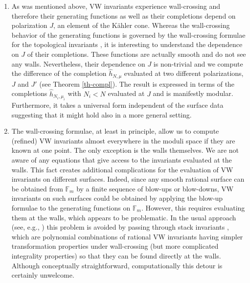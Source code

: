 \documentclass[12pt,letterpaper]{JHEP3}
\newcommand{\IF}{\mathds{F}}
\def\whh{\widehat h}
\begin{document}
\begin{enumerate}
\item 
As was mentioned above, VW invariants experience wall-crossing and therefore their generating functions
as well as their completions depend on polarization $J$, an element of the K\"ahler cone.
Whereas the wall-crossing behavior of the generating functions is governed by the wall-crossing formulae 
for the topological invariants \cite{ks,Joyce:2008pc}, it is interesting to understand the dependence on $J$ of their completions.
These functions are actually smooth and do not see any walls. Nevertheless, their dependence on $J$ is non-trivial
and we compute the difference of the completion $\whh_{N,\mu}$ evaluated at two different polarizations, $J$ and $J'$  
(see Theorem \ref{th-compl}).
The result is expressed in terms of the completions $\whh_{N_i,\mu_i}$ with $N_i<N$ evaluated at $J$ and is manifestly modular.
Furthermore, it takes a universal form independent of the surface data suggesting that it might hold also in a more general setting.

\item 
The wall-crossing formulae, at least in principle, allow us to compute 
(refined) VW invariants almost everywhere in the moduli space if they are known
at one point. The only exception is the walls themselves. We are not aware of any equations that give access to the invariants
evaluated at the walls.
This fact creates additional complications for the evaluation of VW invariants on different surfaces. 
Indeed, since any smooth rational surface can be obtained 
from $\IF_m$ by a finite sequence of blow-ups or blow-downs, 
VW invariants on such surfaces could be obtained by applying the blow-up formulae \cite{Yoshioka:1996,0961.14022,Li:1998nv}
to the generating functions on $\IF_m$. However, this requires evaluating them at the walls, which appears to be problematic.
In the usual approach (see, e.g., \cite{Manschot:2014cca}) 
this problem is avoided by passing through stack invariants \cite{joyce2008configurations}, 
which are polynomial combinations of rational VW invariants having simpler transformation properties under wall-crossing
(but more complicated integrality properties) so that they can be found directly at the walls.
Although conceptually straightforward, computationally this detour is certainly unwelcome.


\end{enumerate}
\end{document}
